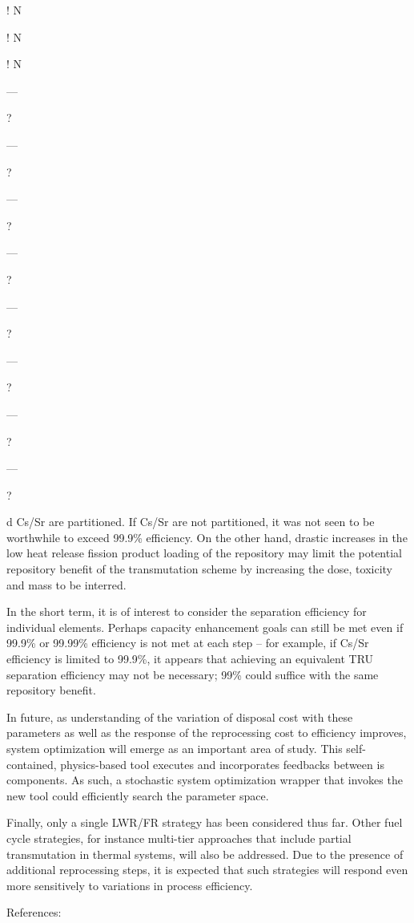 !	N

!	N

!	N

---

?

---

?

---

?

---

?

---

?

---

?

---

?

---

?

d Cs/Sr are partitioned.  If Cs/Sr are not partitioned, it was not seen
to be worthwhile to exceed 99.9\% efficiency.  On the other hand,
drastic increases in the low heat release fission product loading of the
repository may limit the potential repository benefit of the
transmutation scheme by increasing the dose, toxicity and mass to be
interred.

	In the short term, it is of interest to consider the separation
efficiency for individual elements.  Perhaps capacity enhancement goals
can still be met even if 99.9\% or 99.99\% efficiency is not met at each
step -- for example, if Cs/Sr efficiency is limited to 99.9\%, it
appears that achieving an equivalent TRU separation efficiency may not
be necessary; 99\% could suffice with the same repository benefit.  

	In future, as understanding of the variation of disposal cost with
these parameters as well as the response of the reprocessing cost to
efficiency improves, system optimization will emerge as an important
area of study.  This self-contained, physics-based tool executes and
incorporates feedbacks between is components.  As such, a stochastic
system optimization wrapper that invokes the new tool could efficiently
search the parameter space.

	Finally, only a single LWR/FR strategy has been considered thus far. 
Other fuel cycle strategies, for instance multi-tier approaches that
include partial transmutation in thermal systems, will also be
addressed.  Due to the presence of additional reprocessing steps, it is
expected that such strategies will respond even more sensitively to
variations in process efficiency.

References:

